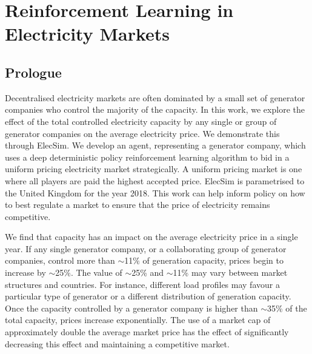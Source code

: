 \chapter{Reinforcement Learning in Electricity Markets}
\label{chapter:reinforcement}
\ifpdf
\graphicspath{{Chapter3/Figs/Raster/}{Chapter3/Figs/PDF/}{Chapter3/Figs/}}
\else
\graphicspath{{Chapter3/Figs/Vector/}{Chapter3/Figs/}}
\fi


\section*{Prologue}


Decentralised electricity markets are often dominated by a small set of generator companies who control the majority of the capacity. In this work, we explore the effect of the total controlled electricity capacity by any single or group of generator companies on the average electricity price. We demonstrate this through ElecSim. We develop an agent, representing a generator company, which uses a deep deterministic policy reinforcement learning algorithm to bid in a uniform pricing electricity market strategically. A uniform pricing market is one where all players are paid the highest accepted price. ElecSim is parametrised to the United Kingdom for the year 2018. This work can help inform policy on how to best regulate a market to ensure that the price of electricity remains competitive.

We find that capacity has an impact on the average electricity price in a single year. If any single generator company, or a collaborating group of generator companies, control more than ${\sim}$11$\%$ of generation capacity, prices begin to increase by ${\sim}$25$\%$. The value of ${\sim}$25\% and ${\sim}$11\% may vary between market structures and countries. For instance, different load profiles may favour a particular type of generator or a different distribution of generation capacity. Once the capacity controlled by a generator company is higher than ${\sim}$35\% of the total capacity, prices increase exponentially. The use of a market cap of approximately double the average market price has the effect of significantly decreasing this effect and maintaining a competitive market.

